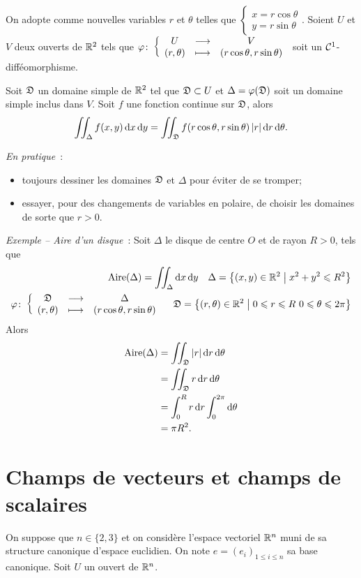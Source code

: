 \begin{theo}
  On adopte comme nouvelles variables \(r\) et \(\theta\) telles que 
  \(\begin{cases} x=r\cos\theta \\ y=r\sin\theta \end{cases}\). Soient \(U\) et 
    \(V\) deux ouverts de \(\mathbb{R}^2\) tels que \(\varphi\colon\left\{\begin{array}{ccc}U & \longrightarrow &V\\(r, 
    \theta) & \longmapsto & (r\cos\theta, r\sin\theta)\end{array}\right.\) soit un 
    \(\mathcal{C}^{1}\)-difféomorphisme.

    Soit \(\mathfrak{D}\) un domaine simple de \(\mathbb{R}^2\) tel que \(\mathfrak{D} \subset 
    U\) et \(\Delta=\varphi(\mathfrak{D})\) soit un domaine simple inclus dans 
    \(V\). Soit \(f\) une fonction continue sur \(\mathfrak{D}\), alors
    \begin{equation}
      \iint_\Delta f(x,y)\mathop{}\mathopen{}\mathrm{d} x \mathop{}\mathopen{}\mathrm{d} y = \iint_{\mathfrak{D}} f(r\cos\theta, 
      r\sin\theta) \left\lvert r\right\rvert\mathop{}\mathopen{}\mathrm{d} r \mathop{}\mathopen{}\mathrm{d} \theta.
    \end{equation}
\end{theo}

\emph{En pratique}~:
\begin{itemize}
  \item toujours dessiner les domaines \(\mathfrak{D}\) et \(\Delta\) pour éviter 
    de se tromper;
  \item essayer, pour des changements de variables en polaire, de choisir les 
    domaines de sorte que \(r>0\).
\end{itemize}

\emph{Exemple -- Aire d'un disque}~: Soit \(\Delta\) le disque de centre \(O\) 
et de rayon \(R>0\), tels que
\begin{align}
  \text{Aire}(\Delta) = \iint_\Delta \diff x \diff y \quad 
  \Delta=\enstq{(x,y)\in\R^2}{x^2+y^2\leqslant R^2} \\
  \fonction{\varphi}{\Ddomaine}{\Delta}{(r, \theta)}{(r\cos\theta, r\sin\theta)} 
  \quad \Ddomaine=\enstq{(r,\theta)\in\R^2}{0 \leqslant r \leqslant R \ 0 
  \leqslant \theta \leqslant 2\pi}
\end{align}
Alors
\begin{align}
  \text{Aire}(\Delta) &= \iint_{\mathfrak{D}} \left\lvert r\right\rvert\mathop{}\mathopen{}\mathrm{d} r \mathop{}\mathopen{}\mathrm{d} \theta \\
  &= \iint_{\mathfrak{D}} r\mathop{}\mathopen{}\mathrm{d} r \mathop{}\mathopen{}\mathrm{d} \theta \\
  &=\int_0^R r\mathop{}\mathopen{}\mathrm{d} r \int_0^{2\pi}\mathop{}\mathopen{}\mathrm{d} \theta \\
  &=\pi R^2.
\end{align}


\section{Champs de vecteurs et champs de scalaires}
\label{sec:champvec}
On suppose que \(n \in \{2, 3\}\) et on considère l'espace vectoriel \(\mathbb{R}^n\) 
muni de sa structure canonique d'espace euclidien. On note \(e=(e_i)_{1 
\leqslant i \leqslant n}\) sa base canonique. Soit \(U\) un ouvert de \(\mathbb{R}^n\).

